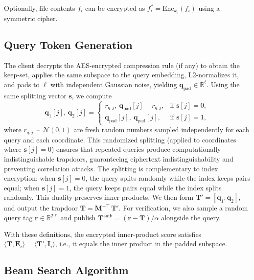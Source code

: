 \documentclass[journal]{IEEEtran}
\begin{document}
Optionally, file contents $f_i$ can be encrypted as $f_i^*=\text{Enc}_{k_e}(f_i)$ using a symmetric cipher.

\subsection{Query Token Generation}

The client decrypts the AES-encrypted compression rule (if any) to obtain the keep-set, applies the same subspace to the query embedding, L2-normalizes it, and pads to $\ell$ with independent Gaussian noise, yielding $\mathbf{q}_{\text{pad}}\in\mathbb{R}^{\ell}$. Using the same splitting vector $\mathbf{s}$, we compute
\begin{equation}
\mathbf{q}_1[j],\,\mathbf{q}_2[j]=\begin{cases}
r_{q,j},\ \mathbf{q}_{\text{pad}}[j] - r_{q,j}, & \text{if } \mathbf{s}[j]=0,\\
\mathbf{q}_{\text{pad}}[j],\ \mathbf{q}_{\text{pad}}[j], & \text{if } \mathbf{s}[j]=1,
\end{cases}
\end{equation}
where $r_{q,j} \sim \mathcal{N}(0,1)$ are fresh random numbers sampled independently for each query and each coordinate. This randomized splitting (applied to coordinates where $\mathbf{s}[j]=0$) ensures that repeated queries produce computationally indistinguishable trapdoors, guaranteeing ciphertext indistinguishability and preventing correlation attacks. The splitting is complementary to index encryption: when $\mathbf{s}[j]=0$, the query splits randomly while the index keeps pairs equal; when $\mathbf{s}[j]=1$, the query keeps pairs equal while the index splits randomly. This duality preserves inner products. We then form $\mathbf{T}'=[\mathbf{q}_1;\mathbf{q}_2]$, and output the trapdoor $\mathbf{T}=\mathbf{M}^{-\top}\,\mathbf{T}'$. For verification, we also sample a random query tag $\mathbf{r}\in\mathbb{R}^{2\ell}$ and publish $\mathbf{T}^{\mathsf{auth}}=(\mathbf{r}-\mathbf{T})/\alpha$ alongside the query.

With these definitions, the encrypted inner-product score satisfies $\langle \mathbf{T}, \mathbf{E}_i\rangle = \langle \mathbf{T}', \mathbf{I}_i\rangle$, i.e., it equals the inner product in the padded subspace.

\subsection{Beam Search Algorithm}
\end{document}
